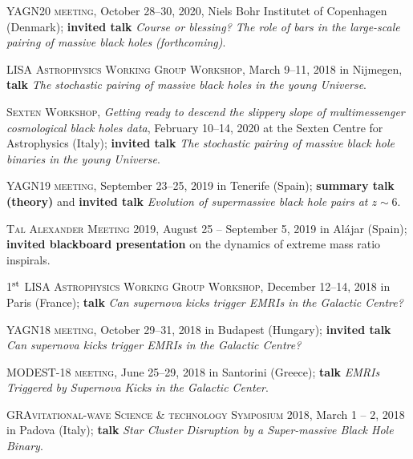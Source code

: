 \begin{etaremune}

    \item \textsc{YAGN20 meeting}, October 28--30, 2020, Niels Bohr Institutet of Copenhagen (Denmark);  {\bf invited talk}  \textit{Course or blessing? The role of bars in the large-scale pairing of massive black holes}
    \textit{(forthcoming)}.
    
        \item \textsc{LISA Astrophysics Working Group Workshop}, March 9--11, 2018 in  Nijmegen,  {\bf talk} {\it The stochastic pairing of massive black holes in the young Universe}.
    
    \item \textsc{Sexten Workshop}, \textit{Getting ready to descend the slippery slope of multimessenger cosmological black holes data}, February 10--14, 2020 at the Sexten Centre for Astrophysics (Italy);  {\bf invited talk} \textit{The stochastic pairing of massive black hole binaries in the young Universe}.

    \item \textsc{YAGN19 meeting}, September 23--25, 2019 in  Tenerife (Spain); \textbf{summary talk (theory)} and {\bf invited talk}  {\it Evolution of supermassive black hole pairs at $z\sim 6$}.

    \item \textsc{Tal Alexander Meeting 2019,}%
     August 25 -- September 5, 2019 in Al\'ajar (Spain); {\bf invited blackboard presentation} on the dynamics of extreme mass ratio inspirals.

    \item \textsc{1$^{\rm st}$ LISA Astrophysics Working Group Workshop}, December 12--14, 2018 in  Paris (France); 
 {\bf talk} {\it Can supernova kicks trigger EMRIs in the Galactic Centre?}

    \item \textsc{YAGN18 meeting}, October 29--31, 2018 in  Budapest (Hungary); {\bf invited talk} {\it Can supernova kicks trigger EMRIs in the Galactic Centre?}

    \item \textsc{MODEST-18 meeting}, June 25--29, 2018 in Santorini (Greece); {\bf talk} {\it  EMRIs Triggered by Supernova Kicks in the Galactic Center}.

    \item \textsc{GRAvitational-wave Science \& technology Symposium 2018,} March 1 -- 2, 2018  in Padova (Italy);  {\bf talk} {\it Star Cluster Disruption by a Super-massive Black Hole Binary}.



\end{etaremune}
